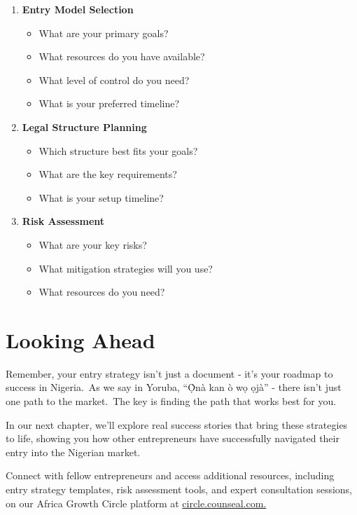 \begin{enumerate}
    \item \textbf{Entry Model Selection}
    \begin{itemize}
        \item What are your primary goals?
        \item What resources do you have available?
        \item What level of control do you need?
        \item What is your preferred timeline?
    \end{itemize}
    \item \textbf{Legal Structure Planning}
    \begin{itemize}
        \item Which structure best fits your goals?
        \item What are the key requirements?
        \item What is your setup timeline?
    \end{itemize}
    \item \textbf{Risk Assessment}
    \begin{itemize}
        \item What are your key risks?
        \item What mitigation strategies will you use?
        \item What resources do you need?
    \end{itemize}
\end{enumerate}


\section{Looking Ahead}\label{sec:looking-ahead}

Remember, your entry strategy isn't just a document - it's your roadmap to success in Nigeria.\ As we say in Yoruba, ``Ọ̀nà kan ò wọ ọjà'' - there isn't just one path to the market.\ The key is finding the path that works best for you.

In our next chapter, we'll explore real success stories that bring these strategies to life, showing you how other entrepreneurs have successfully navigated their entry into the Nigerian market.

Connect with fellow entrepreneurs and access additional resources, including entry strategy templates, risk assessment tools, and expert consultation sessions, on our Africa Growth Circle platform at \href{https://viz.li/csl-book-circle}{circle.counseal.com.}